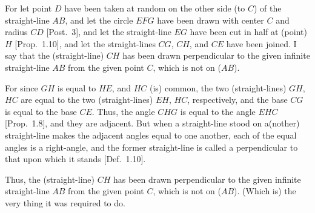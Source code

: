 \begin{Parallel}{}{}
{For let point $D$ have been taken at random on the other side (to $C$) of 
the straight-line $AB$, and let the circle $EFG$ have been drawn
with center $C$ and radius $CD$ [Post.~3], and let the straight-line $EG$ have been cut
in half at (point) $H$ [Prop.~1.10], and let the straight-lines $CG$, $CH$,
and $CE$ have been joined. I say that the  (straight-line) $CH$ has
been drawn  perpendicular to the given infinite straight-line
$AB$ from the given point $C$, which is not on ($AB$).

For since $GH$ is equal to $HE$, and $HC$ (is) common, the two (straight-lines) $GH$, 
$HC$
are equal to the two (straight-lines) $EH$, $HC$, respectively, and the base $CG$ is
equal to the base $CE$. Thus, the angle $CHG$ is equal to the
angle $EHC$ [Prop.~1.8], and they are adjacent. But when a straight-line
stood on a(nother) straight-line makes the adjacent angles equal to one another, each of the equal angles is a right-angle, and the former straight-line is called a perpendicular to that upon which it stands [Def.~1.10].

Thus, the (straight-line) $CH$ has been drawn perpendicular to the given infinite straight-line $AB$ from the given point $C$, which is not
on  ($AB$). (Which is) the very thing it was required to do.}
\end{Parallel}

